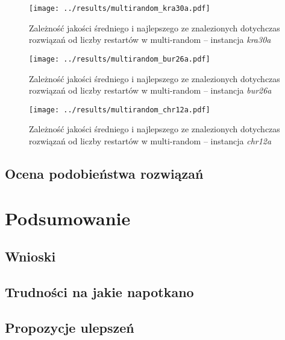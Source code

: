 \documentclass{article}
\begin{document}
			\begin{figure}[h]
				\texttt{[image: ../results/multirandom\_kra30a.pdf]}
				\caption{Zależność jakości średniego i najlepszego ze znalezionych dotychczas rozwiązań od liczby restartów w multi-random -- instancja \emph{kra30a}\label{fig:mr.kra30a}}		
			\end{figure}
			\begin{figure}[h]
				\texttt{[image: ../results/multirandom\_bur26a.pdf]}
				\caption{Zależność jakości średniego i najlepszego ze znalezionych dotychczas rozwiązań od liczby restartów w multi-random -- instancja \emph{bur26a}\label{fig:mr.bur26a}}		
			\end{figure}
			\begin{figure}[h]
				\texttt{[image: ../results/multirandom\_chr12a.pdf]}
				\caption{Zależność jakości średniego i najlepszego ze znalezionych dotychczas rozwiązań od liczby restartów w multi-random -- instancja \emph{chr12a}\label{fig:mr.chr12a}}		
			\end{figure}

	\subsection{Ocena podobieństwa rozwiązań}
\section{Podsumowanie}
	\subsection{Wnioski}
	\subsection{Trudności na jakie napotkano}
	\subsection{Propozycje ulepszeń}




\end{document}
